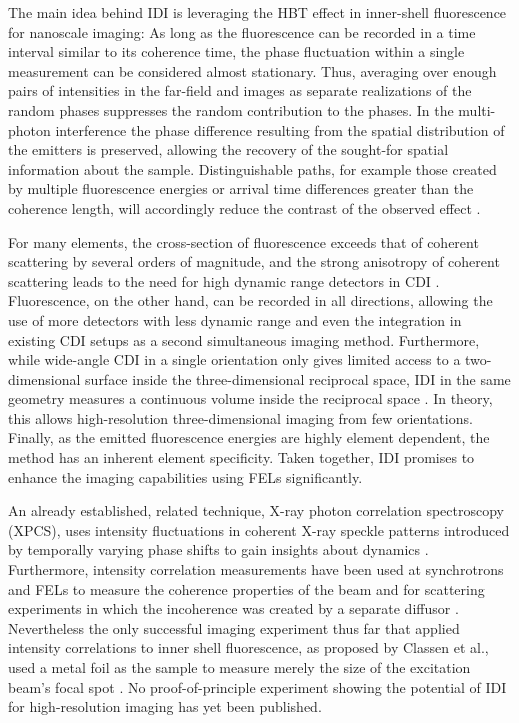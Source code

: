 The main idea behind IDI is leveraging the HBT effect in inner-shell fluorescence for nanoscale imaging: As long as the fluorescence can be recorded in a time interval similar to its coherence time, the phase fluctuation within a single measurement can be considered almost stationary. Thus, averaging over enough pairs of intensities in the far-field and images as separate realizations of the random phases suppresses the random contribution to the phases.  In the multi-photon interference the phase difference resulting from the spatial distribution of the emitters is preserved,  allowing the recovery of the sought-for spatial information about the sample. Distinguishable paths, for example those created by multiple fluorescence energies or arrival time differences greater than the coherence length, will accordingly reduce the contrast of the observed effect \cite{classen2017,trost2020}. 

For many elements, the cross-section of fluorescence exceeds that of coherent scattering by several orders of magnitude, and the strong anisotropy of coherent scattering leads to the need for high dynamic range detectors in CDI \cite{xraylib,attwood1999}.  Fluorescence, on the other hand, can be recorded in all directions, allowing the use of more detectors with less dynamic range and even the integration in existing CDI setups as a second simultaneous imaging method. Furthermore, while wide-angle CDI in a single orientation only gives limited access to a two-dimensional surface inside the three-dimensional reciprocal space, IDI in the same geometry measures a continuous volume inside the reciprocal space \cite{barke2015,classen2017}. In theory, this allows high-resolution three-dimensional imaging from few orientations. Finally, as the emitted fluorescence energies are highly element dependent, the method has an inherent element specificity. Taken together, IDI promises to enhance the imaging capabilities using FELs significantly. 

An already established, related technique, X-ray photon correlation spectroscopy (XPCS), uses intensity fluctuations in coherent X-ray speckle patterns introduced by temporally varying phase shifts to gain insights about dynamics \cite{lehmkuhler2021,grubel2007}. Furthermore, intensity correlation measurements have been used at synchrotrons and FELs to measure the coherence properties of the beam and for scattering experiments in which the incoherence was created by a separate diffusor \cite{yabashi2002,singer2013,inoue2019,gorobtsov2018,schneider2018}.  Nevertheless the only successful imaging experiment thus far that applied intensity correlations to inner shell fluorescence, as proposed by Classen et al., used a metal foil as the sample to measure merely the size of the excitation beam's focal spot \cite{nakumura2020}. No proof-of-principle experiment showing the potential of IDI for high-resolution imaging has yet been published. 

